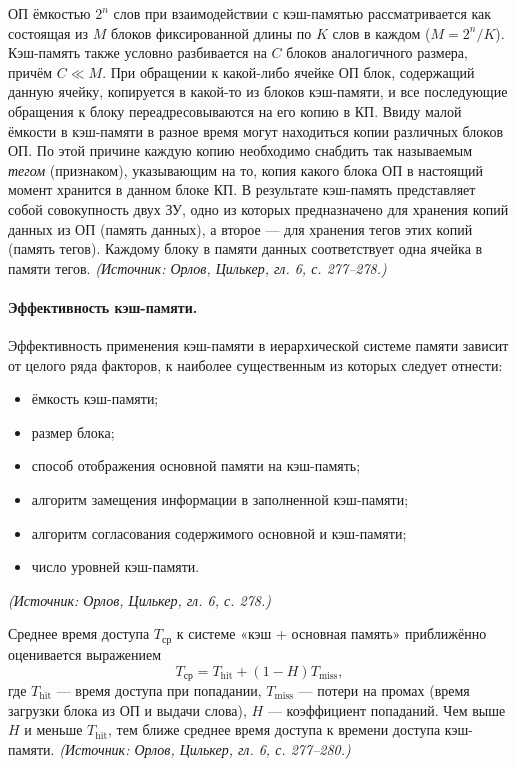 \documentclass[a4paper,12pt]{article}
\begin{document}
ОП ёмкостью \(2^n\) слов при взаимодействии с кэш-памятью рассматривается как состоящая из \(M\) блоков фиксированной длины по \(K\) слов в каждом (\(M=2^n/K\)). Кэш-память также условно разбивается на \(C\) блоков аналогичного размера, причём \(C\ll M\). При обращении к какой-либо ячейке ОП блок, содержащий данную ячейку, копируется в какой-то из блоков кэш-памяти, и все последующие обращения к блоку переадресовываются на его копию в КП. Ввиду малой ёмкости в кэш-памяти в разное время могут находиться копии различных блоков ОП. По этой причине каждую копию необходимо снабдить так называемым \emph{тегом} (признаком), указывающим на то, копия какого блока ОП в настоящий момент хранится в данном блоке КП. В результате кэш-память представляет собой совокупность двух ЗУ, одно из которых предназначено для хранения копий данных из ОП (память данных), а второе --- для хранения тегов этих копий (память тегов). Каждому блоку в памяти данных соответствует одна ячейка в памяти тегов.
\textit{(Источник: Орлов, Цилькер, гл. 6, с. 277--278.)}

\paragraph{Эффективность кэш-памяти.}
Эффективность применения кэш-памяти в иерархической системе памяти зависит от целого ряда факторов, к наиболее существенным из которых следует отнести:
\begin{itemize}
\item ёмкость кэш-памяти;
\item размер блока;
\item способ отображения основной памяти на кэш-память;
\item алгоритм замещения информации в заполненной кэш-памяти;
\item алгоритм согласования содержимого основной и кэш-памяти;
\item число уровней кэш-памяти.
\end{itemize}
\textit{(Источник: Орлов, Цилькер, гл. 6, с. 278.)}

Среднее время доступа \(T_{\text{ср}}\) к системе «кэш + основная память» приближённо оценивается выражением
\[
T_{\text{ср}}=T_{\text{hit}}+(1-H)T_{\text{miss}},
\]
где \(T_{\text{hit}}\) --- время доступа при попадании, \(T_{\text{miss}}\) --- потери на промах (время загрузки блока из ОП и выдачи слова), \(H\) --- коэффициент попаданий. Чем выше \(H\) и меньше \(T_{\text{hit}}\), тем ближе среднее время доступа к времени доступа кэш-памяти.
\textit{(Источник: Орлов, Цилькер, гл. 6, с. 277--280.)}
\end{document}
